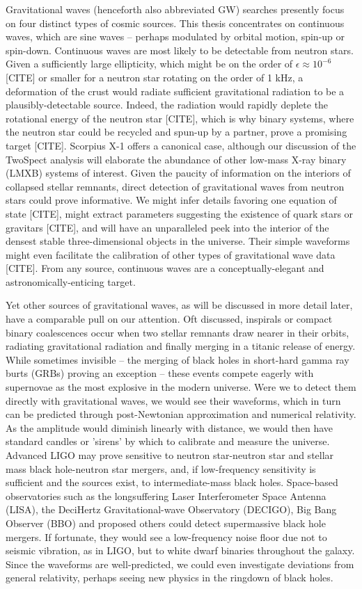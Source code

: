		Gravitational waves (henceforth also abbreviated GW) searches presently focus on four distinct types of cosmic sources. This thesis concentrates on continuous waves, which are sine waves -- perhaps modulated by orbital motion, spin-up or spin-down. Continuous waves are most likely to be detectable from neutron stars. Given a sufficiently large ellipticity, which might be on the order of $\epsilon \approx 10^{-6}$ [CITE] or smaller for a neutron star rotating on the order of 1 kHz, a deformation of the crust would radiate sufficient gravitational radiation to be a plausibly-detectable source. Indeed, the radiation would rapidly deplete the rotational energy of the neutron star [CITE], which is why binary systems, where the neutron star could be recycled and spun-up by a partner, prove a promising target [CITE]. Scorpius X-1 offers a canonical case, although our discussion of the TwoSpect analysis will elaborate the abundance of other low-mass X-ray binary (LMXB) systems of interest. Given the paucity of information on the interiors of collapsed stellar remnants, direct detection of gravitational waves from neutron stars could prove informative. We might infer details favoring one equation of state [CITE], might extract parameters suggesting the existence of quark stars or gravitars [CITE], and will have an unparalleled peek into the interior of the densest stable three-dimensional objects in the universe. Their simple waveforms might even facilitate the calibration of other types of gravitational wave data [CITE]. From any source, continuous waves are a conceptually-elegant and astronomically-enticing target.

		Yet other sources of gravitational waves, as will be discussed in more detail later, have a comparable pull on our attention. Oft discussed, inspirals or compact binary coalescences occur when two stellar remnants draw nearer in their orbits, radiating gravitational radiation and finally merging in a titanic release of energy. While sometimes invisible -- the merging of black holes in short-hard gamma ray burts (GRBs) proving an exception -- these events compete eagerly with supernovae as the most explosive in the modern universe. Were we to detect them directly with gravitational waves, we would see their waveforms, which in turn can be predicted through post-Newtonian approximation and numerical relativity. As the amplitude would diminish linearly with distance, we would then have standard candles or 'sirens' by which to calibrate and measure the universe. Advanced LIGO may prove sensitive to neutron star-neutron star and stellar mass black hole-neutron star mergers, and, if low-frequency sensitivity is sufficient and the sources exist, to intermediate-mass black holes. Space-based observatories such as the longsuffering Laser Interferometer Space Antenna (LISA), the DeciHertz Gravitational-wave Observatory (DECIGO), Big Bang Observer (BBO) and proposed others could detect supermassive black hole mergers. If fortunate, they would see a low-frequency noise floor due not to seismic vibration, as in LIGO, but to white dwarf binaries throughout the galaxy. Since the waveforms are well-predicted, we could even investigate deviations from general relativity, perhaps seeing new physics in the ringdown of black holes.

